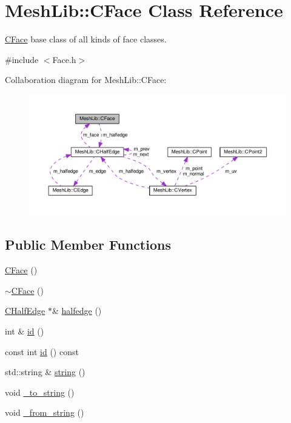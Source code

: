 \hypertarget{class_mesh_lib_1_1_c_face}{}\section{Mesh\+Lib\+:\+:C\+Face Class Reference}
\label{class_mesh_lib_1_1_c_face}


\hyperlink{class_mesh_lib_1_1_c_face}{C\+Face} base class of all kinds of face classes.  




{\ttfamily \#include $<$Face.\+h$>$}



Collaboration diagram for Mesh\+Lib\+:\+:C\+Face\+:
\nopagebreak
\begin{figure}[H]
\begin{center}
\leavevmode
\includegraphics[width=350pt]{class_mesh_lib_1_1_c_face__coll__graph}
\end{center}
\end{figure}
\subsection*{Public Member Functions}
\begin{DoxyCompactItemize}
\item 
\hyperlink{class_mesh_lib_1_1_c_face_a3425979e07f04a516148a3e113ac7eab}{C\+Face} ()
\item 
\hyperlink{class_mesh_lib_1_1_c_face_a4146152b7902dad419181da0d23e74cb}{$\sim$\+C\+Face} ()
\item 
\hyperlink{class_mesh_lib_1_1_c_half_edge}{C\+Half\+Edge} $\ast$\& \hyperlink{class_mesh_lib_1_1_c_face_a6142ef04a531c8d364452db5ac3c7ba2}{halfedge} ()
\item 
int \& \hyperlink{class_mesh_lib_1_1_c_face_ae4eb0aaf069c3b17b324acfac47a66f0}{id} ()
\item 
const int \hyperlink{class_mesh_lib_1_1_c_face_a93c2cba1e9d3b986613b15e0e333909a}{id} () const 
\item 
std\+::string \& \hyperlink{class_mesh_lib_1_1_c_face_a2bedc65d146d2600d2c47d0aeb4233bb}{string} ()
\item 
void \hyperlink{class_mesh_lib_1_1_c_face_aa367b3ce68f1df45aa7dfdbd8e4ad1cb}{\+\_\+to\+\_\+string} ()
\item 
void \hyperlink{class_mesh_lib_1_1_c_face_a1470ee81803c0ca6a4cd29fcb4bc4925}{\+\_\+from\+\_\+string} ()
\end{DoxyCompactItemize}
